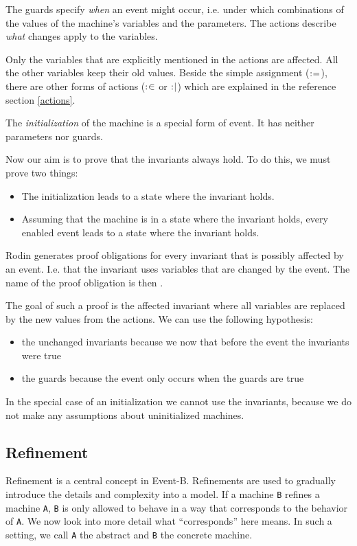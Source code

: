 The guards specify \emph{when} an event might occur, i.e. under which combinations
of the values of the machine's variables and the parameters.
The actions describe \emph{what} changes apply to the variables.

Only the variables that are explicitly mentioned in the actions are affected.
All the other variables keep their old values. Beside the simple assignment ($\mathrel{:\mkern1mu=}$),
there are other forms of actions ($\mathrel{:\mkern1mu\in}$ or $\mathrel{:\mkern1mu\mid}$) which are explained in
the reference section \ref{actions}.

The \emph{initialization} of the machine is a special form of event. It has neither parameters
nor guards.

Now our aim is to prove that the invariants always hold. To do this, we must prove two things:
\begin{itemize}
  \item The initialization leads to a state where the invariant holds.
  \item Assuming that the machine is in a state where the invariant holds,
    every enabled event leads to a state where the invariant holds.
\end{itemize}
Rodin generates proof obligations for every invariant that is possibly affected by an event.
I.e. that the invariant uses variables that are changed by the event.
The name of the proof obligation is then .

The goal of such a proof is the affected invariant where all variables are replaced by
the new values from the actions. We can use the following hypothesis:
\begin{itemize}
\item the unchanged invariants because we now that before the event the invariants were true
\item the guards because the event only occurs when the guards are true
\end{itemize}
In the special case of an initialization we cannot use the invariants, because we do not
make any assumptions about uninitialized machines.

\subsection{Refinement}
\label{tutorial:refinement}
Refinement is a central concept in Event-B. Refinements are used to gradually
introduce the details and complexity into a model.
If a machine \texttt{B} refines a machine \texttt{A}, \texttt{B} is only allowed to behave in a way that
corresponds to the behavior of \texttt{A}. We now look into more detail what ``corresponds''
here means.
In such a setting, we call \texttt{A} the abstract and \texttt{B} the concrete machine.

